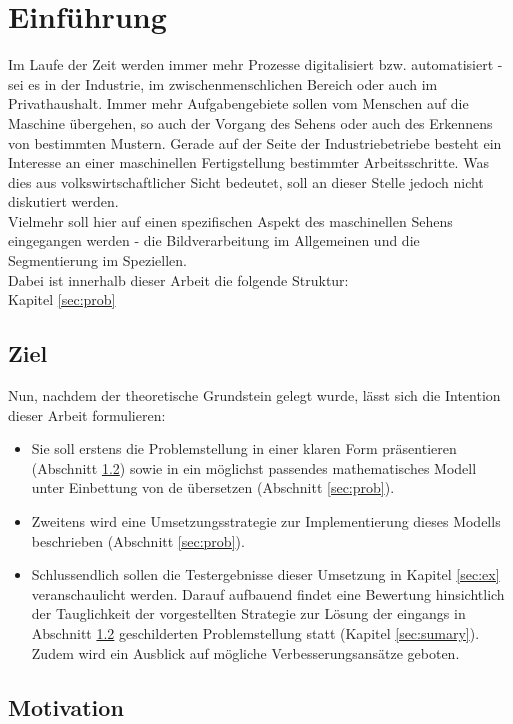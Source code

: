 
\chapter{Einführung}
\label{sec:intro}
	
	Im Laufe der Zeit werden immer mehr Prozesse digitalisiert bzw. 
	automatisiert - sei es in der Industrie, im zwischenmenschlichen 
	Bereich oder auch im Privathaushalt. Immer mehr Aufgabengebiete sollen vom 
	Menschen auf die Maschine übergehen, so auch der Vorgang des Sehens oder 
	auch des Erkennens von bestimmten Mustern. Gerade auf der Seite der 
	Industriebetriebe besteht ein Interesse an einer maschinellen 
	Fertigstellung bestimmter Arbeitsschritte. Was dies aus 
	volkswirtschaftlicher Sicht bedeutet, soll an dieser Stelle jedoch nicht 
	diskutiert werden. \\
	Vielmehr soll hier auf einen spezifischen Aspekt des maschinellen Sehens 
	eingegangen werden - die Bildverarbeitung im Allgemeinen und die 
	Segmentierung im Speziellen. \\
	Dabei ist innerhalb dieser Arbeit die folgende Struktur: \\
	Kapitel \ref{sec:prob}
		
	\section{Ziel}
	\label{sec:ziel}
	
		Nun, nachdem der theoretische Grundstein gelegt wurde, lässt sich die Intention dieser Arbeit formulieren:
		\begin{itemize}
			\item Sie soll erstens die Problemstellung in einer klaren Form präsentieren (Abschnitt \ref{sec:motivation}) sowie in ein möglichst passendes mathematisches Modell unter Einbettung von \gls{de} übersetzen (Abschnitt \ref{sec:prob}).
			\item Zweitens wird eine Umsetzungsstrategie zur Implementierung dieses Modells beschrieben (Abschnitt \ref{sec:prob}).
			\item Schlussendlich sollen die Testergebnisse dieser Umsetzung in Kapitel \ref{sec:ex} veranschaulicht werden. Darauf aufbauend findet eine Bewertung hinsichtlich der Tauglichkeit der vorgestellten Strategie zur Lösung der eingangs in Abschnitt \ref{sec:motivation} geschilderten Problemstellung statt (Kapitel \ref{sec:sumary}). Zudem wird ein Ausblick auf mögliche Verbesserungsansätze geboten. 
		\end{itemize}
	
	\section{Motivation}
	\label{sec:motivation}